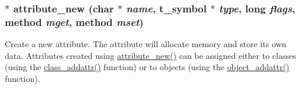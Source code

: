 \hypertarget{group__attr_ga24badeb31a79d844935b2a1c8423c905}{
\subsubsection[{attribute\_\-new}]{$\ast$ attribute\_\-new (char $\ast$ {\em name}, \/  {\bf t\_\-symbol} $\ast$ {\em type}, \/  long {\em flags}, \/  {\bf method} {\em mget}, \/  {\bf method} {\em mset})}}
\label{group__attr_ga24badeb31a79d844935b2a1c8423c905}


Create a new attribute. The attribute will allocate memory and store its own data. Attributes created using \hyperlink{group__attr_ga24badeb31a79d844935b2a1c8423c905}{attribute\_\-new()} can be assigned either to classes (using the \hyperlink{group__class_ga2289eb7e26b552be6e015c2f9912a9ac}{class\_\-addattr()} function) or to objects (using the \hyperlink{group__attr_ga69d88788c952e914ecccd88179d0dfda}{object\_\-addattr()} function).


